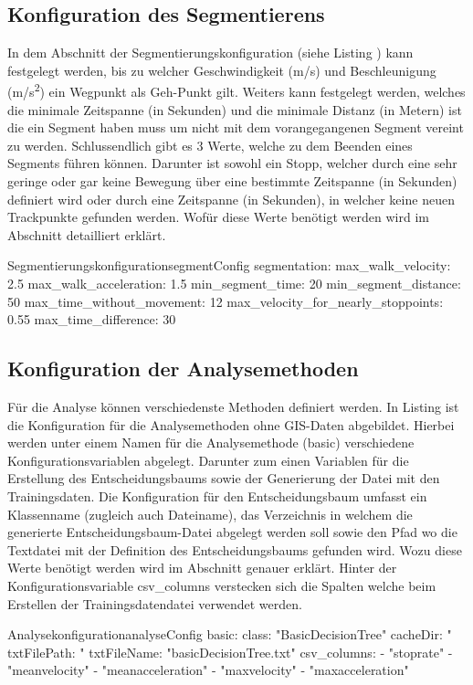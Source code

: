 \subsection{Konfiguration des Segmentierens}
In dem Abschnitt der Segmentierungskonfiguration (siehe Listing ) kann festgelegt werden, bis zu welcher Geschwindigkeit (m/s) und Beschleunigung (m/s\textsuperscript{2}) ein Wegpunkt als Geh-Punkt gilt. Weiters kann festgelegt werden, welches die minimale Zeitspanne (in Sekunden) und die minimale Distanz (in Metern) ist die ein Segment haben muss um nicht mit dem vorangegangenen Segment vereint zu werden. Schlussendlich gibt es 3 Werte, welche zu dem Beenden eines Segments führen können. Darunter ist sowohl ein Stopp, welcher durch eine sehr geringe oder gar keine Bewegung über eine bestimmte Zeitspanne (in Sekunden) definiert wird oder durch eine Zeitspanne (in Sekunden), in welcher keine neuen Trackpunkte gefunden werden. Wofür diese Werte benötigt werden wird im Abschnitt  detailliert erklärt.

\begin{code}[]{Segmentierungskonfiguration}{segmentConfig}
  segmentation:
    max_walk_velocity: 2.5
    max_walk_acceleration: 1.5
    min_segment_time: 20
    min_segment_distance: 50
    max_time_without_movement: 12
    max_velocity_for_nearly_stoppoints: 0.55
    max_time_difference: 30
\end{code}

\subsection{Konfiguration der Analysemethoden}
Für die Analyse können verschiedenste Methoden definiert werden. In Listing  ist die Konfiguration für die Analysemethoden ohne GIS-Daten abgebildet. Hierbei werden unter einem Namen für die Analysemethode (basic) verschiedene Konfigurationsvariablen abgelegt. Darunter zum einen Variablen für die Erstellung des Entscheidungsbaums sowie der Generierung der Datei mit den Trainingsdaten. Die Konfiguration für den Entscheidungsbaum umfasst ein Klassenname (zugleich auch Dateiname), das Verzeichnis in welchem die generierte Entscheidungsbaum-Datei abgelegt werden soll sowie den Pfad wo die Textdatei mit der Definition des Entscheidungsbaums gefunden wird. Wozu diese Werte benötigt werden wird im Abschnitt  genauer erklärt. Hinter der Konfigurationsvariable csv\_columns verstecken sich die Spalten welche beim Erstellen der Trainingsdatendatei verwendet werden.

\begin{code}[]{Analysekonfiguration}{analyseConfig}
    basic:
      class: "BasicDecisionTree"
      cacheDir: "%
      txtFilePath: "%
      txtFileName: "basicDecisionTree.txt"
      csv_columns:
        - "stoprate"
        - "meanvelocity"
        - "meanacceleration"
        - "maxvelocity"
        - "maxacceleration"
\end{code}
